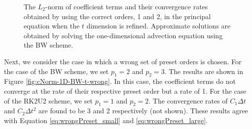\begin{figure}[!htb]
\centering
{}
\hskip 20pt
\caption{The $L_2$-norm of coefficient terms and their convergence rates obtained by using the correct orders, 1 and 2, in the principal equation when the $t$ dimension is refined. Approximate solutions are obtained by solving the one-dimensional advection equation using the BW scheme.}
\label{fig:cNorm-1D-BW-t-correct}
\end{figure}

Next, we consider the case in which a wrong set of preset orders is chosen. For the case of the BW scheme, we set $p_1 = 2$ and $p_2 = 3$. The results are shown in Figure \ref{fig:cNorm-1D-BW-t-wrong}. In this case, the coefficient terms do not converge at the rate of their respective preset order but a rate of 1. For the case of the RK2U2 scheme, we set $p_1 = 1$ and $p_2 = 2$. The convergence rates of $C_{1} \Delta t$ and $C_{2} \Delta t^2$ are found to be 3 and 2 respectively (not shown). These results agree with Equation \ref{eq:wrongPreset_small} and \ref{eq:wrongPreset_large}.

